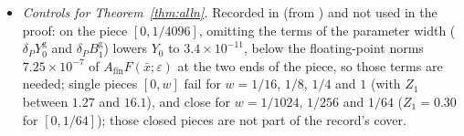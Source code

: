 \documentclass[11pt]{article}
\theoremstyle{definition}
\begin{document}
\begin{itemize}
\item \emph{Controls for Theorem~\ref{thm:alln}.} Recorded in  (from ) and not used in the proof: on the piece $[0, 1/4096]$, omitting the terms of the parameter width ($\delta_PY^{\mathrm g}_0$ and $\delta_PB^{\mathrm g}_1$) lowers $Y_0$ to $3.4 \times 10^{-11}$, below the floating-point norms $7.25 \times 10^{-7}$ of $A_{\mathrm{fin}}F(\bar x;\varepsilon)$ at the two ends of the piece, so those terms are needed; single pieces $[0, w]$ fail for $w = 1/16$, $1/8$, $1/4$ and $1$ (with $Z_1$ between $1.27$ and $16.1$), and close for $w = 1/1024$, $1/256$ and $1/64$ ($Z_1 = 0.30$ for $[0, 1/64]$); those closed pieces are not part of the record's cover.
\end{itemize}
\end{document}
